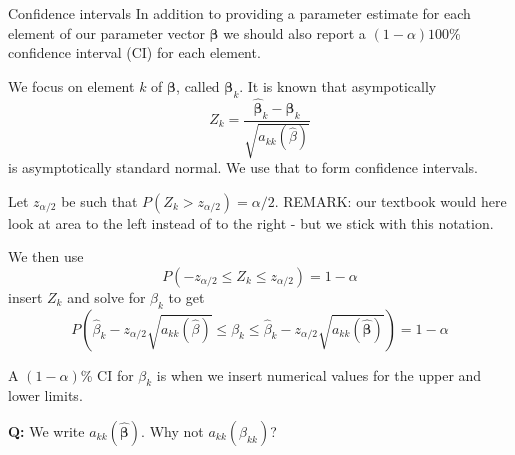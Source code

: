 \documentclass[
  ignorenonframetext,
]{beamer}
\begin{document}
\begin{frame}
\begin{block}{Confidence intervals}
\protect\hypertarget{confidence-intervals}{}
In addition to providing a parameter estimate for each element of our
parameter vector \(\boldsymbol{\beta}\) we should also report a
\((1-\alpha)100\)\% confidence interval (CI) for each element.

We focus on element \(k\) of \(\boldsymbol{\beta}\), called
\(\boldsymbol{\beta}_k\). It is known that asympotically
\[ Z_k=\frac{\hat{\boldsymbol{\beta}}_k-\boldsymbol{\beta}_k}{\sqrt{{a}_{kk}(\hat{\beta})}}\]
is asymptotically standard normal. We use that to form confidence
intervals.

Let \(z_{\alpha/2}\) be such that \(P(Z_k>z_{\alpha/2})=\alpha/2\).
REMARK: our textbook would here look at area to the left instead of to
the right - but we stick with this notation.
\end{block}
\end{frame}

\begin{frame}
We then use \[ P(-z_{\alpha/2}\le Z_k \le z_{\alpha/2})=1-\alpha\]
insert \(Z_k\) and solve for \(\beta_k\) to get
\[ P(\hat{\beta}_k-z_{\alpha/2}\sqrt{a_{kk}(\hat{\beta})}
\le \beta_k \le \hat{\beta}_k-z_{\alpha/2}\sqrt{a_{kk}(\hat{\boldsymbol{\beta}})})=1-\alpha\]

A \((1-\alpha)\)\% CI for \(\beta_k\) is when we insert numerical values
for the upper and lower limits.

\textbf{Q:} We write \(a_{kk}(\hat{\boldsymbol{\beta}})\). Why not
\(a_{kk}(\hat{\beta}_{kk})\)?
\end{frame}
\end{document}
